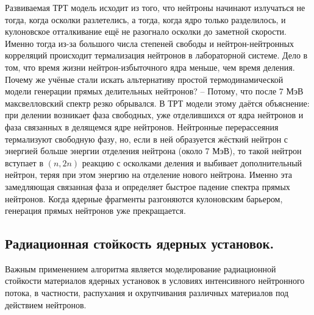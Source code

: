 \documentclass[a4paper,12pt]{article}
\begin{document}
\begin{large}
  Развиваемая ТРТ модель исходит из того, что нейтроны начинают излучаться не тогда, когда осколки разлетелись, а тогда, когда ядро только разделилось, и кулоновское отталкивание ещё не разогнало осколки до заметной скорости.
  Именно тогда из-за большого числа степеней свободы и нейтрон-нейтронных корреляций происходит термализация нейтронов в лабораторной системе.
  Дело в том, что время жизни нейтрон-избыточного ядра меньше, чем время деления.
  Почему же учёные стали искать альтернативу простой термодинамической модели генерации прямых делительных нейтронов? -- Потому, что после 7 МэВ максвелловский спектр резко обрывался.
  В ТРТ модели этому даётся объяснение: при делении возникает фаза свободных, уже отделившихся от ядра нейтронов и фаза связанных в делящемся ядре нейтронов.
  Нейтронные перерассеяния термализуют свободную фазу, но, если в ней образуется жёсткий нейтрон с энергией больше энергии отделения нейтрона (около 7 МэВ), то такой нейтрон вступает в $(n,2n)$ реакцию с осколками деления и выбивает дополнительный нейтрон, теряя при этом энергию на отделение нового нейтрона.
  Именно эта замедляющая связанная фаза и определяет быстрое падение спектра прямых нейтронов.
  Когда ядерные фрагменты разгоняются кулоновским барьером, генерация прямых нейтронов уже прекращается.
  
\subsection{Радиационная стойкость ядерных установок.}
\label{subSol3}

	Важным применением алгоритма является моделирование радиационной стойкости материалов ядерных установок в условиях интенсивного нейтронного потока, в частности, распухания и охрупчивания различных материалов под действием нейтронов.
  

\end{large}
\end{document}
